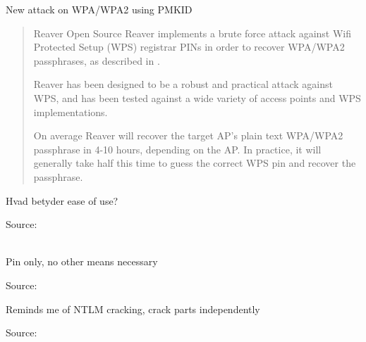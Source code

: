 \documentclass[Screen16to9,17pt]{foils}
\begin{document}
\begin{list2}
\item {} New attack on WPA/WPA2 using PMKID
\item {}
\end{list2}




\begin{quote}
Reaver Open Source
Reaver implements a brute force attack against Wifi Protected Setup (WPS) registrar PINs in order to recover WPA/WPA2 passphrases, as described in .

Reaver has been designed to be a robust and practical attack against WPS, and has been tested against a wide variety of access points and WPS implementations.

On average Reaver will recover the target AP's plain text WPA/WPA2 passphrase in 4-10 hours, depending on the AP. In practice, it will generally take half this time to guess the correct WPS pin and recover the passphrase.
\end{quote}

\centerline{Hvad betyder ease of use?}

Source: \\
\\
{\footnotesize {}}



\centerline{Pin only, no other means necessary}

Source:\\



\centerline{Reminds me of NTLM cracking, crack parts independently}

Source:\\
\end{document}
